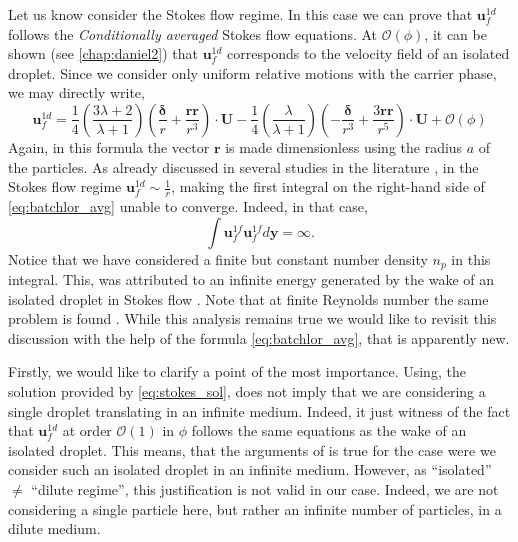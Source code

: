 Let us know consider the Stokes flow regime.
In this case we can prove that $\textbf{u}_f^{1d}$ follows the \textit{Conditionally averaged} Stokes flow equations. 
At $\mathcal{O}(\phi)$, it can be shown (see \ref{chap:daniel2}) that $\textbf{u}_f^{1d}$ corresponds to the velocity field of an isolated droplet.
Since we consider only uniform relative motions with the carrier phase, we may directly write, 
\begin{equation}
    \textbf{u}_f^{1d}
    = 
    \frac{1}{4}\left(\frac{3\lambda + 2}{\lambda +1}\right)
    \left(\frac{ \bm\delta}{r} + \frac{\textbf{rr}}{r^3}\right)  \cdot \textbf{U}
    - 
    \frac{1}{4}\left(\frac{\lambda}{\lambda +1}\right)
    \left(-\frac{\bm\delta}{r^3} + \frac{3 \textbf{rr} }{r^5}\right) 
    \cdot \textbf{U}
    + \mathcal{O}(\phi)
    \label{eq:stokes_sol}
\end{equation}
Again, in this formula the vector $\textbf{r}$ is made dimensionless using the radius $a$ of the particles. 
As already discussed in several studies in the literature \citet{caflisch1985variance}, 
in the Stokes flow regime $\textbf{u}_f^{1d} \sim \frac{1}{r}$, making the first integral on the right-hand side of \ref{eq:batchlor_avg} unable to converge. 
Indeed, in that case, 
\begin{equation}
    \int \textbf{u}_f^{1f} \textbf{u}_f^{1f}  d \textbf{y} = \infty.
    \label{eq:non_convergence}
\end{equation}
Notice that we have considered a finite but constant number density $n_p$ in this integral. 
This, was attributed to an infinite energy generated by the wake of an isolated droplet in Stokes flow \citet{caflisch1985variance}. 
Note that at finite Reynolds number the same problem is found \citet{koch1993hydrodynamic}. 
While this analysis remains true we would like to revisit this discussion with the help of the formula \ref{eq:batchlor_avg}, that is apparently new. 

Firstly, we would like to clarify a point of the most importance. 
Using, the solution provided by \ref{eq:stokes_sol}, does not imply that we are considering a single droplet translating in an infinite medium.
Indeed, it just witness of the fact that   $\textbf{u}_f^{1d}$ at order $\mathcal{O}(1)$ in $\phi$ follows the same equations as the wake of an isolated droplet. 
This means, that the arguments of \citet{caflisch1985variance} is true for the case were we consider such an isolated droplet in an infinite medium.
However, as ``isolated'' $\neq$ ``dilute regime'', this justification is not valid in our case.
Indeed, we are not considering a single particle here, but rather an infinite number of particles, in a dilute medium.   

